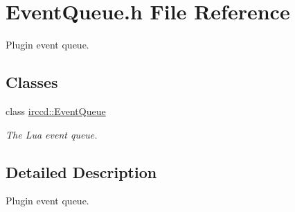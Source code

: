 \hypertarget{a00077}{\section{Event\-Queue.\-h File Reference}
\label{a00077}
}


Plugin event queue.  


\subsection*{Classes}
\begin{DoxyCompactItemize}
\item 
class \hyperlink{a00028}{irccd\-::\-Event\-Queue}
\begin{DoxyCompactList}\small\item\em The Lua event queue. \end{DoxyCompactList}\end{DoxyCompactItemize}


\subsection{Detailed Description}
Plugin event queue. 